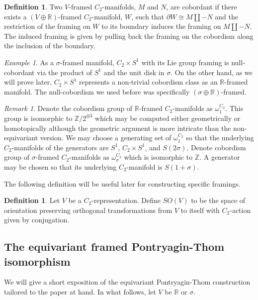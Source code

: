 \documentclass[11pt]{amsart}
\newcommand{\R}{\mathbb R}
\newcommand{\Z}{\mathbb{Z}}
\theoremstyle{plain}   %
\theoremstyle{definition}
\newtheorem{df}[thm]{Definition}
\theoremstyle{remark}
\newtheorem{rmk}[thm]{Remark}
\newtheorem{ex}[thm]{Example}
\numberwithin{equation}{section}
\begin{document}
\begin{df}
Two $V$-framed $C_2$-manifolds, $M$ and $N$, are cobordant if there exists a $(V\oplus\R)$-framed $C_2$-manifold, $W$, such that $\partial W \cong  M\amalg -N$ and the restriction of the framing on $W$ to its boundary induces the framing on $M\amalg -N$. The induced framing is given by pulling back the framing on the cobordism along the inclusion of the boundary.
\end{df}

\begin{ex}
As a $\sigma$-framed manifold, $C_2\times S^1$ with its Lie group framing is null-cobordant via the product of $S^1$ and the unit disk in $\sigma$. On the other hand, as we will prove later, $C_2\times S^1$ represents a non-trivial cobordism class as an $\R$-framed manifold. The null-cobordism we used before was specifically $(\sigma\oplus\R)$-framed. 
\end{ex}

\begin{rmk}
Denote the cobordism group of $\R$-framed $C_2$-manifolds as $\omega_1^{C_2}$. This group is isomorphic to $\Z/2^{\oplus 3}$ which may be computed either geometrically or homotopically although the geometric argument is more intricate than the non-equivariant version. We may choose a generating set of $\omega_1^{C_2}$ so that the underlying $C_2$-manifolds of the generators are $S^1$, $C_2\times S^1$, and $S(2\sigma)$. Denote cobordism group of $\sigma$-framed $C_2$-manifolds as $\omega_\sigma^{C_2}$ which is isomorphic to $\Z$. A generator may be chosen so that its underlying $C_2$-manifold is $S(1+\sigma)$. 
\end{rmk}

The following definition will be useful later for constructing specific framings. 

\begin{df}\label{df:orthogonal}
Let $V$ be a $C_2$-representation. Define $SO(V)$ to be the space of orientation preserving orthogonal transformations from $V$ to itself with $C_2$-action given by conjugation.
\end{df}

\subsection{The equivariant framed Pontryagin-Thom isomorphism}

We will give a short exposition of the equivariant Pontryagin-Thom construction tailored to the paper at hand. In what follows, let $V$ be $\R$ or $\sigma$. 
\end{document}
